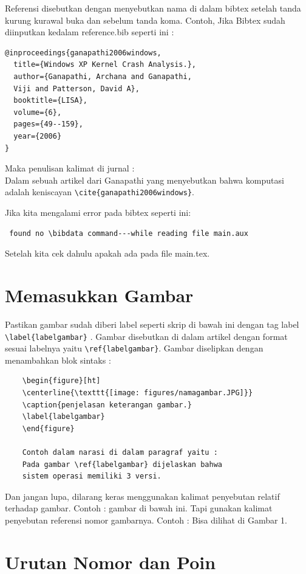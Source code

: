 Referensi disebutkan dengan menyebutkan nama di dalam bibtex setelah tanda kurung kurawal buka dan sebelum tanda koma. Contoh, Jika Bibtex sudah diinputkan kedalam reference.bib seperti ini :
\begin{verbatim}
@inproceedings{ganapathi2006windows,
  title={Windows XP Kernel Crash Analysis.},
  author={Ganapathi, Archana and Ganapathi, 
  Viji and Patterson, David A},
  booktitle={LISA},
  volume={6},
  pages={49--159},
  year={2006}
}
\end{verbatim}
Maka penulisan kalimat di jurnal : \\
Dalam sebuah artikel dari Ganapathi yang 
menyebutkan bahwa komputasi adalah keniscayan \verb|\cite{ganapathi2006windows}|.

Jika kita mengalami error pada bibtex seperti ini:
\begin{verbatim}
 found no \bibdata command---while reading file main.aux
\end{verbatim}
Setelah kita cek dahulu apakah ada \verb|| pada file main.tex.

	
	
\section{Memasukkan Gambar}

Pastikan gambar sudah diberi label seperti skrip di bawah ini dengan tag label \verb|\label{labelgambar}| . Gambar disebutkan di dalam artikel dengan format sesuai labelnya yaitu \verb|\ref{labelgambar}|. Gambar diselipkan dengan menambahkan blok sintaks :
    \begin{verbatim}
    \begin{figure}[ht]
    \centerline{\texttt{[image: figures/namagambar.JPG]}}
    \caption{penjelasan keterangan gambar.}
    \label{labelgambar}
    \end{figure}
    
   	Contoh dalam narasi di dalam paragraf yaitu :
    Pada gambar \ref{labelgambar} dijelaskan bahwa 
    sistem operasi memiliki 3 versi.
    \end{verbatim}

Dan jangan lupa, dilarang keras menggunakan kalimat penyebutan relatif terhadap gambar. Contoh : gambar di bawah ini. Tapi gunakan kalimat penyebutan referensi nomor gambarnya. Contoh : Bisa dilihat di Gambar 1.

\section{Urutan Nomor dan Poin}

